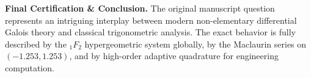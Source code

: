 \documentclass[11pt,a4paper]{article}
\begin{document}
\begin{thmbox}
\textbf{Final Certification \& Conclusion.} The original manuscript question represents an intriguing interplay between modern non-elementary differential Galois theory and classical trigonometric analysis. The exact behavior is fully described by the ${}_1F_2$ hypergeometric system globally, by the Maclaurin series on $(-1.253, 1.253)$, and by high-order adaptive quadrature for engineering computation.
\end{thmbox}
\end{document}
